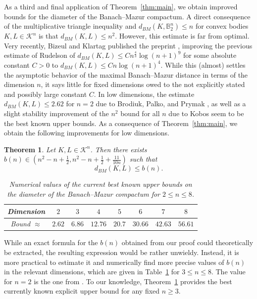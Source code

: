 \documentclass{amsart}
\newtheorem{theorem}{Theorem}[section]
\newcommand\B{\mathbb{B}}
\newcommand\CK{\mathcal{K}}
\begin{document}
As a third and final application of Theorem~\ref{thm:main}, we obtain improved bounds for
the diameter of the Banach--Mazur compactum.
A direct consequence of the multiplicative triangle inequality and $d_{BM}(K,\B_2^n) \leq n$ for convex bodies $K,L \in \CK^n$
is that $d_{BM}(K,L) \leq n^2$.
However, this estimate is far from optimal.
Very recently, Bizeul and Klartag published the preprint \cite{2025:BizeulKlartag}, improving the previous estimate of Rudelson \cite{2000:Rudelson} of $d_{BM}(K,L) \leq C n ^{\frac{4}{3}} \log(n+1)^9$ for some absolute constant $C>0$ to $d_{BM}(K,L) \leq C n \log(n+1)^4$.
While this (almost) settles the asymptotic behavior of the maximal Banach--Mazur distance in terms of the dimension $n$,
it says little for fixed dimensions owed to the not explicitly stated and possibly large constant $C$.
In low dimensions, the estimate $d_{BM}(K,L)\leq 2.62$ for $n = 2$ due to Brodiuk, Palko, and Prymak \cite{2018:BrodiukPalkoPrymak},
as well as a slight stability improvement of the $n^2$ bound for all $n$ due to Kobos \cite[Corollary~6]{2019:Kobos} seem to be the best known upper bounds.
As a consequence of Theorem~\ref{thm:main}, we obtain the following improvements for low dimensions.



\begin{theorem}\label{thm:BMdistance}
Let $K,L \in \CK^n$.
Then there exists $b(n) \in (n^2 - n + \frac{1}{2},  n^2 - n + \frac{1}{2} + \frac{11}{10n})$ such that
\[
    d_{BM}(K,L)
    \leq b(n).
\]
\begin{table}[ht]
    \centering
    \begin{tabular}{|c|c|c|c|c|c|c|c|}
        \hline
        Dimension & $2$ & $3$ & $4$ & $5$ & $6$ & $7$ & $8$ \\
        \hline 
        Bound $\approx$ & $2.62$ & $6.86$ & $12.76$ & $20.7$ & $30.66$ & $42.63$ & $56.61$ \\
        \hline
    \end{tabular}
    \caption{Numerical values of the current best known upper bounds on the diameter of the Banach--Mazur compactum for $2 \leq n \leq 8$.}
    \label{tab:bn}
\end{table}
\end{theorem}

While an exact formula for the $b(n)$ obtained from our proof could theoretically be extracted,
the resulting expression would be rather unwieldy.
Instead, it is more practical to estimate it and numerically find more precise values of $b(n)$ in the relevant dimensions, which are given in Table~\ref{tab:bn} for $3 \leq n \leq 8$.
The value for $n = 2$ is the one from \cite{2018:BrodiukPalkoPrymak}.
To our knowledge, Theorem~\ref{thm:BMdistance}
provides the best currently known explicit upper bound for any fixed $n \geq 3$.
\pagebreak
\end{document}

